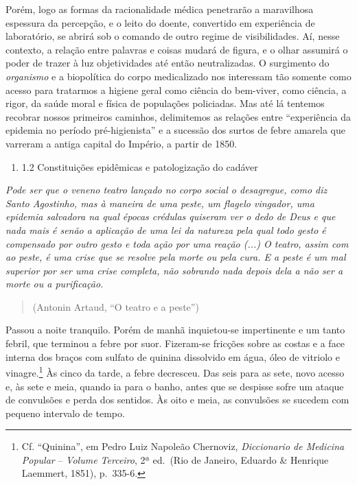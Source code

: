 Porém, logo as formas da racionalidade médica penetrarão a maravilhosa
espessura da percepção, e o leito do doente, convertido em experiência
de laboratório, se abrirá sob o comando de outro regime de
visibilidades. Aí, nesse contexto, a relação entre palavras e coisas
mudará de figura, e o olhar assumirá o poder de trazer à luz
objetividades até então neutralizadas. O surgimento do \emph{organismo}
e a biopolítica do corpo medicalizado nos interessam tão somente como
acesso para tratarmos a higiene geral como ciência do bem-viver, como
ciência, a rigor, da saúde moral e física de populações policiadas. Mas
até lá tentemos recobrar nossos primeiros caminhos, delimitemos as
relações entre ``experiência da epidemia no período pré-higienista'' e a
sucessão dos surtos de febre amarela que varreram a antiga capital do
Império, a partir de 1850.

\begin{enumerate}
\def\labelenumi{\arabic{enumi}.}
\setcounter{enumi}{1}
\tightlist
\item
  1.2 Constituições epidêmicas e patologização do cadáver
\end{enumerate}

\emph{Pode ser que o veneno teatro lançado no corpo social o desagregue,
como diz Santo Agostinho, mas à maneira de uma peste, um flagelo
vingador, uma epidemia salvadora na qual épocas crédulas quiseram ver o
dedo de Deus e que nada mais é senão a aplicação de uma lei da natureza
pela qual todo gesto é compensado por outro gesto e toda ação por uma
reação (...) O teatro, assim com ao peste, é uma crise que se resolve
pela morte ou pela cura. E a peste é um mal superior por ser uma crise
completa, não sobrando nada depois dela a não ser a morte ou a
purificação.}

\begin{quote}
(Antonin Artaud, ``O teatro e a peste'')
\end{quote}

Passou a noite tranquilo. Porém de manhã inquietou-se impertinente e um
tanto febril, que terminou a febre por suor. Fizeram-se fricções sobre
as costas e a face interna dos braços com sulfato de quinina dissolvido
em água, óleo de vitriolo e vinagre.\footnote{Cf. ``Quinina'', em Pedro
  Luiz Napoleão Chernoviz, \emph{Diccionario de Medicina Popular} --
  \emph{Volume Terceiro}, 2ª ed.~(Rio de Janeiro, Eduardo \& Henrique
  Laemmert, 1851), p.~335-6.} Às cinco da tarde, a febre decresceu. Das
seis para as sete, novo acesso e, às sete e meia, quando ia para o
banho, antes que se despisse sofre um ataque de convulsões e perda dos
sentidos. Às oito e meia, as convulsões se sucedem com pequeno intervalo
de tempo.

